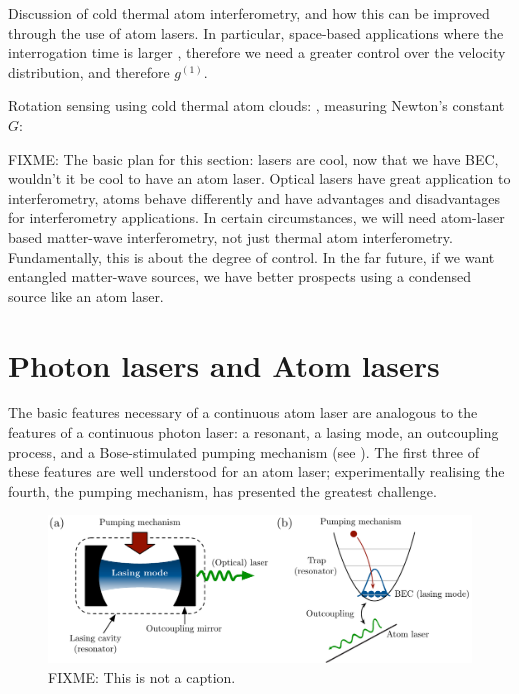 Discussion of cold thermal atom interferometry, and how this can be improved through the use of atom lasers.  In particular, space-based applications where the interrogation time is larger \citep{Le-Coq:2006}, therefore we need a greater control over the velocity distribution, and therefore $g^{(1)}$.

Rotation sensing using cold thermal atom clouds: \citep{Canuel:2006}, measuring Newton's constant $G$: \citep{Lamporesi:2008}

FIXME: The basic plan for this section: lasers are cool, now that we have BEC, wouldn't it be cool to have an atom laser.  Optical lasers have great application to interferometry, atoms behave differently and have advantages and disadvantages for interferometry applications.  In certain circumstances, we will need atom-laser based matter-wave interferometry, not just thermal atom interferometry.  Fundamentally, this is about the degree of control.  In the far future, if we want entangled matter-wave sources, we have better prospects using a condensed source like an atom laser.

\section{Photon lasers and Atom lasers}
\label{Introduction:PhotonAndAtomLasers}

The basic features necessary of a continuous atom laser are analogous to the features of a continuous photon laser: a resonant, a lasing mode, an outcoupling process, and a Bose-stimulated pumping mechanism (see ).  The first three of these features are well understood for an atom laser; experimentally realising the fourth, the pumping mechanism, has presented the greatest challenge.

\begin{figure}
    \centering
    \includegraphics[width=14cm]{LaserAtomLaserComparison}
    \caption{
        \label{Introduction:LaserAtomLaserComparison}
        FIXME: This is not a caption.
    }
\end{figure}

